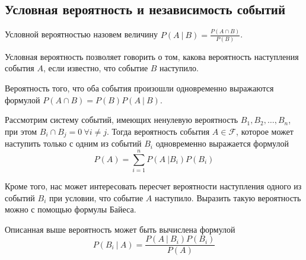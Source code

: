 \subsection{Условная вероятность и независимость событий}

\begin{definition}
    Условной вероятностью назовем величину $\displaystyle P(A ~|~ B) = \frac{P(A \cap B)}{P(B)}$.
\end{definition}
Условная вероятность позволяет говорить о том, какова вероятность наступления
события $A$, если известно, что событие $B$ наступило.

\begin{theorem}
    Вероятность того, что оба события произошли одновременно выражаются формулой
    $P(A \cap B) = P(B) P(A ~|~ B)$.
\end{theorem}

\begin{theorem}
    Рассмотрим систему событий, имеющих ненулевую вероятность $B_1, B_2, \dots, B_n$, при этом
    $B_i \cap B_j = 0 ~ \forall i \neq j$. Тогда вероятность
    события $A \in \mathcal{F}$, которое может наступить только
    с одним из событий $B_i$ одновременно выражается формулой
    \begin{equation}
        P(A) = \sum\limits_{i = 1}^n P(A ~| B_i) P(B_i)
    \end{equation}
\end{theorem}

Кроме того, нас может интересовать пересчет вероятности наступления
одного из событий $B_i$ при условии, что событие $A$ наступило.
Выразить такую вероятность можно с помощью формулы Байеса.
\begin{theorem}
    Описанная выше вероятность может быть вычислена формулой
    \begin{equation}
        P(B_i ~|~ A) = \frac{P(A ~|~ B_i)P(B_i)}{P(A)}
    \end{equation}
\end{theorem}

